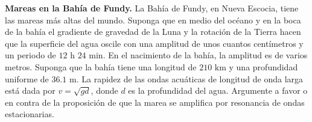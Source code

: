 \item \textbf{Mareas en la Bahía de Fundy.}
La Bahía de Fundy, en Nueva Escocia, tiene las mareas más altas del mundo. Suponga que en medio del océano y en la boca de la bahía el gradiente de gravedad de la Luna y la rotación de la Tierra hacen que la superficie del agua oscile con una amplitud de unos cuantos centímetros y un periodo de $12\text{ h } 24\text{ min}$. En el nacimiento de la bahía, la amplitud es de varios metros. Suponga que la bahía tiene una longitud de $210\text{ km}$ y una profundidad uniforme de $36.1\text{ m}$. La rapidez de las ondas acuáticas de longitud de onda larga está dada por $v = \sqrt{gd}$, donde $d$ es la profundidad del agua. Argumente a favor o en contra de la proposición de que la marea se amplifica por resonancia de ondas estacionarias.